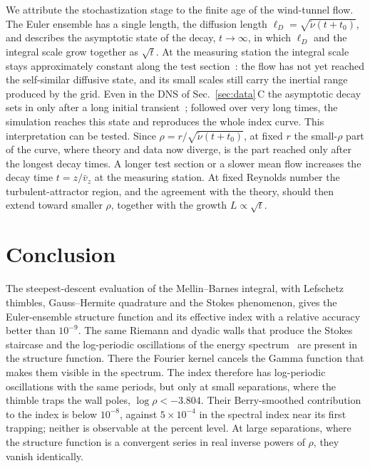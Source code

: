 \documentclass[aip,pof,preprint,floatfix,nofootinbib,amsmath,amssymb]{revtex4-2}
\begin{document}
We attribute the stochastization stage to the finite age of the wind-tunnel flow. The Euler ensemble has a single length,
the diffusion length $\ell_D=\sqrt{\tilde\nu(t+t_0)}$, and describes the asymptotic state of the decay, $t\to\infty$, in which
$\ell_D$ and the integral scale grow together as $\sqrt t$. At the measuring station the integral scale stays approximately
constant along the test section~\cite{GregXi2}: the flow has not yet reached the self-similar diffusive state, and its small
scales still carry the inertial range produced by the grid. Even in the DNS of Sec.~\ref{sec:data}\,C the asymptotic decay
sets in only after a long initial transient~\cite{SreeniAkash2025}; followed over very long times, the simulation reaches this
state and reproduces the whole index curve. This interpretation can be tested. Since $\rho=r/\sqrt{\tilde\nu(t+t_0)}$, at
fixed $r$ the small-$\rho$ part of the curve, where theory and data now diverge, is the part reached only after the longest
decay times. A longer test section or a slower mean flow increases the decay time $t=z/\bar v_z$ at the measuring station. At
fixed Reynolds number the turbulent-attractor region, and the agreement with the theory, should then extend toward smaller
$\rho$, together with the growth $L\propto\sqrt t$.

\section{Conclusion}

The steepest-descent evaluation of the Mellin--Barnes integral, with Lefschetz thimbles, Gauss--Hermite quadrature and the
Stokes phenomenon, gives the Euler-ensemble structure function and its effective index with a relative accuracy better than
$10^{-9}$. The same
Riemann and dyadic walls that produce the Stokes staircase and the log-periodic oscillations of the energy
spectrum~\cite{migdal2026Riemann} are present in the structure function. There the Fourier kernel cancels the Gamma function
that makes them visible in the spectrum. The index therefore has log-periodic oscillations with the same periods, but only at
small separations, where the thimble traps the wall poles, $\log\rho<-3.804$. Their Berry-smoothed contribution to the index
is below $10^{-8}$, against $5\times10^{-4}$ in the spectral index near its first trapping; neither is observable at the
percent level. At large separations, where the structure function is a convergent series in real inverse powers of $\rho$,
they vanish identically.
\end{document}
